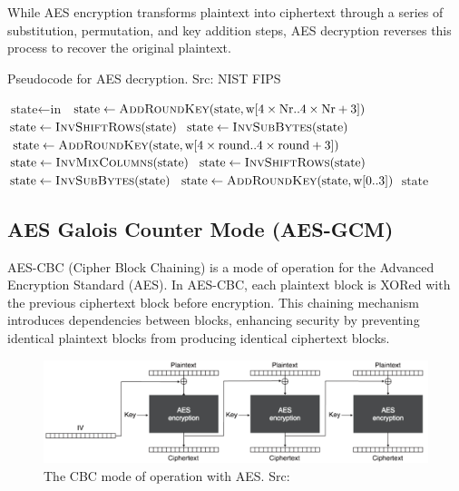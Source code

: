 \documentclass[runningheads]{llncs}
\begin{document}
While AES encryption transforms plaintext into ciphertext through a series of substitution, permutation, and key addition steps, AES decryption reverses this process to recover the original plaintext.

\begin{algorithm}[hbt!]
\caption{Pseudocode for AES decryption. Src: NIST FIPS\cite{AES_NIST}}
\begin{algorithmic}[1] %
        \State $\text{state} \gets \text{in}$
        \State $\text{state} \gets \Call{AddRoundKey}{\text{state}, \text{w}[4 \times \text{Nr}..4 \times \text{Nr} + 3]}$
            \State $\text{state} \gets \Call{InvShiftRows}{\text{state}}$
            \State $\text{state} \gets \Call{InvSubBytes}{\text{state}}$
            \State $\text{state} \gets \Call{AddRoundKey}{\text{state}, \text{w}[4 \times \text{round}..4 \times \text{round} + 3]}$
            \State $\text{state} \gets \Call{InvMixColumns}{\text{state}}$
        \EndFor
        \State $\text{state} \gets \Call{InvShiftRows}{\text{state}}$
        \State $\text{state} \gets \Call{InvSubBytes}{\text{state}}$
        \State $\text{state} \gets \Call{AddRoundKey}{\text{state}, \text{w}[0..3]}$
        \State \Return $\text{state}$
    \EndProcedure
\end{algorithmic}
\label{fig:algo_aes_decrypt}
\end{algorithm}


\newpage
\subsection{AES Galois Counter Mode (AES-GCM)}

AES-CBC (Cipher Block Chaining) is a mode of operation for the Advanced Encryption Standard (AES). In AES-CBC, each plaintext block is XORed with the previous ciphertext block before encryption. This chaining mechanism introduces dependencies between blocks, enhancing security by preventing identical plaintext blocks from producing identical ciphertext blocks.

\begin{figure}[ht] %
    \centering
    \includegraphics[scale=0.55]{resources/AES_CBC.png}
    \caption{The CBC mode of operation with AES. Src: \cite{book_real_world_crypto}}
\end{figure}
\end{document}
